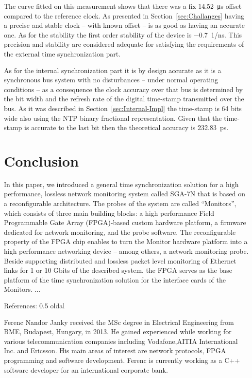 \documentclass[journal]{IEEEtran}
\begin{document}
The curve fitted on this measurement shows that there was a fix \SI{14.52}{\micro\second} offset compared to the
reference clock. As presented in Section~\ref{sec:Challanges}
having a precise and stable clock -- with known offset -- is as good as having an accurate one. As for the stability
the first order stability of the
device is \SI{-0.7}{1/\nano\second}. This precision and stability are considered adequate for satisfying the
requirements of the external time synchronization part.

As for the internal synchronization part it is by design accurate as it is a synchronous bus system with no
disturbances -- under normal operating conditions -- as a
consequence the clock accuracy over that bus is determined by the bit width and the refresh rate of the digital
time-stamp transmitted over the bus. As it was described in Section~\ref{sec:Internal-Impl} the
time-stamp is 64 bits wide also using the NTP binary fractional representation. Given that the time-stamp is accurate
to the last bit then the theoretical accuracy is \SI{232.83}{\pico\second}.

\section{Conclusion}

In this paper, we introduced a general time synchronization solution for a high performance, lossless network monitoring system called SGA-7N that is based on a reconfigurable architecture. The probes of the system are called ``Monitors'', which consists of three main building blocks: a high performance Field Programmable Gate Array (FPGA)-based custom hardware platform, a firmware dedicated for network monitoring, and the probe software. The reconfigurable property of the FPGA chip enables to turn the Monitor hardware platform into a high performance networking device -- among others, a network monitoring probe. Beside supporting distributed and lossless packet level monitoring of Ethernet links for 1 or 10 Gbit\/s of the described system, the FPGA serves as the base platform of the time synchronization solution for the interface cards of the Monitors.
...

References: 0.5 oldal


\begin{IEEEbiography}{Ferenc Nandor Janky} 
received the MSc degree in Electrical Engineering from BME, Budapest, Hungary, in 2013.
He gained experienced while working for various telecommunication companies including Vodafone,AITIA International Inc. and Ericsson.
His main areas of interest are network protocols, FPGA programming and software development. 
Ferenc is currently working as a C++ software developer for an international corporate bank.
\end{IEEEbiography}
\end{document}

